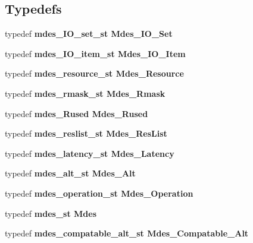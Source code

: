 \subsection*{Typedefs}
\begin{CompactItemize}
\item 
typedef \bf{mdes\_\-IO\_\-set\_\-st} \bf{Mdes\_\-IO\_\-Set}
\item 
typedef \bf{mdes\_\-IO\_\-item\_\-st} \bf{Mdes\_\-IO\_\-Item}
\item 
typedef \bf{mdes\_\-resource\_\-st} \bf{Mdes\_\-Resource}
\item 
typedef \bf{mdes\_\-rmask\_\-st} \bf{Mdes\_\-Rmask}
\item 
typedef \bf{mdes\_\-Rused} \bf{Mdes\_\-Rused}
\item 
typedef \bf{mdes\_\-reslist\_\-st} \bf{Mdes\_\-Res\-List}
\item 
typedef \bf{mdes\_\-latency\_\-st} \bf{Mdes\_\-Latency}
\item 
typedef \bf{mdes\_\-alt\_\-st} \bf{Mdes\_\-Alt}
\item 
typedef \bf{mdes\_\-operation\_\-st} \bf{Mdes\_\-Operation}
\item 
typedef \bf{mdes\_\-st} \bf{Mdes}
\item 
typedef \bf{mdes\_\-compatable\_\-alt\_\-st} \bf{Mdes\_\-Compatable\_\-Alt}
\end{CompactItemize}
